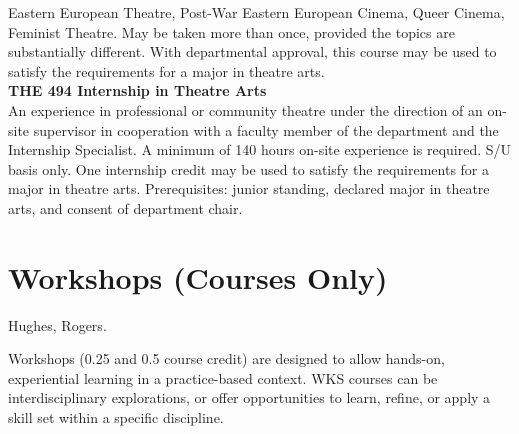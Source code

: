 \documentclass[
  letterpaper,
]{scrbook}
\begin{document}
Eastern European Theatre, Post-War Eastern European Cinema, Queer
Cinema, Feminist Theatre. May be taken more than once, provided the
topics are substantially different. With departmental approval, this
course may be used to satisfy the requirements for a major in theatre
arts.\\
\textbf{THE 494 Internship in Theatre Arts}\\
An experience in professional or community theatre under the direction
of an on-site supervisor in cooperation with a faculty member of the
department and the Internship Specialist. A minimum of 140 hours on-site
experience is required. S/U basis only. One internship credit may be
used to satisfy the requirements for a major in theatre arts.
Prerequisites: junior standing, declared major in theatre arts, and
consent of department chair.

\section{Workshops (Courses Only)}\label{workshops-courses-only}

Hughes, Rogers.

Workshops (0.25 and 0.5 course credit) are designed to allow hands-on,
experiential learning in a practice-based context. WKS courses can be
interdisciplinary explorations, or offer opportunities to learn, refine,
or apply a skill set within a specific discipline.
\end{document}
